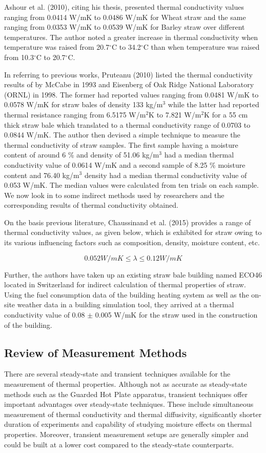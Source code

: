 \documentclass[12pt]{report}
\begin{document}
 Ashour et al. (2010), citing his thesis, presented thermal conductivity
values ranging from 0.0414 W/mK to 0.0486 W/mK for Wheat straw and the
same ranging from 0.0353 W/mK to 0.0539 W/mK for Barley straw over
different temperatures. The author noted a greater increase in thermal
conductivity when temperature was raised from 20.7\(^{\circ}\)C to
34.2\(^{\circ}\)C than when temperature was raised from
10.3\(^{\circ}\)C to 20.7\(^{\circ}\)C.

 In referring to previous works, Pruteanu (2010) listed the thermal
conductivity results of by McCabe in 1993 and Eisenberg of Oak Ridge
National Laboratory (ORNL) in 1998. The former had reported values
ranging from 0.0481 W/mK to 0.0578 W/mK for straw bales of density 133
kg/m\(^{3}\) while the latter had reported thermal resistance ranging
from 6.5175 W/m\(^{2}\)K to 7.821 W/m\(^{2}\)K for a 55 cm thick straw
bale which translated to a thermal conductivity range of 0.0703 to
0.0844 W/mK. The author then devised a simple technique to measure the
thermal conductivity of straw samples. The first sample having a
moisture content of around 6 \% and density of 51.06 kg/m\(^{3}\) had a
median thermal conductivity value of 0.0614 W/mK and a second sample of
8.25 \% moisture content and 76.40 kg/m\(^{3}\) density had a median
thermal conductivity value of 0.053 W/mK. The median values were
calculated from ten trials on each sample.\\

We now look in to some indirect methods used by researchers and the
corresponding results of thermal conductivity obtained.

 On the basis previous literature, Chaussinand et al. (2015) provides a
range of thermal conductivity values, as given below, which is exhibited
for straw owing to its various influencing factors such as composition,
density, moisture content, etc.

\[0.052 W/mK \leq \lambda \leq 0.12 W/mK\]

Further, the authors have taken up an existing straw bale building named
ECO46 located in Switzerland for indirect calculation of thermal
properties of straw. Using the fuel consumption data of the building
heating system as well as the on-site weather data in a building
simulation tool, they arrived at a thermal conductivity value of 0.08
\(\pm\) 0.005 W/mK for the straw used in the construction of the
building.


\subsection*{Review of Measurement Methods}
There are several steady-state and transient techniques available for the measurement of thermal properties. Although not as accurate as steady-state methods such as the Guarded Hot Plate apparatus, transient techniques offer important advantages over steady-state techniques. These include simultaneous measurement of thermal conductivity and thermal diffusivity, significantly shorter duration of experiments and capability of studying moisture effects on thermal properties.  Moreover, transient measurement setups are generally simpler and could be built at a lower cost compared to the steady-state counterparts.
\end{document}
